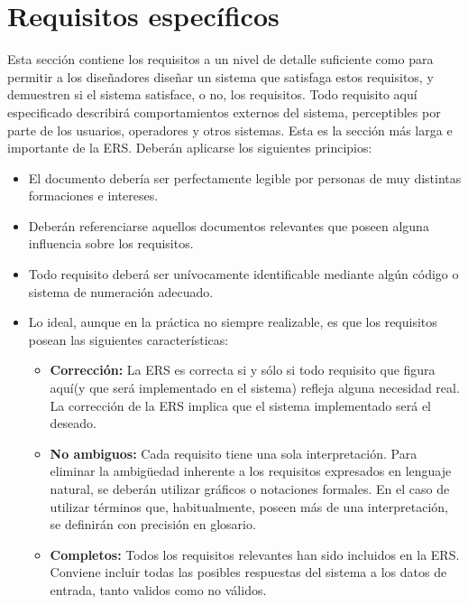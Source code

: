 \documentclass[12pt,a4paper, twosite]{article}
\begin{document}
	
	
	\section{Requisitos específicos}
	\label{sec:org40573d1}
	
	Esta sección contiene los requisitos a un nivel de detalle suficiente
	como para permitir a los diseñadores diseñar un sistema que
	satisfaga estos requisitos, y demuestren si el sistema satisface, o
	no, los requisitos. Todo requisito aquí especificado describirá
	comportamientos externos del sistema, perceptibles por parte de los
	usuarios, operadores y otros sistemas. Esta es la sección más larga
	e importante de la ERS. Deberán aplicarse los siguientes principios:
	
	\begin{itemize}
		\item El documento debería ser perfectamente legible por personas de muy
		distintas formaciones e intereses.
		
		\item Deberán referenciarse aquellos documentos relevantes que poseen
		alguna influencia sobre los requisitos.
		
		\item Todo requisito deberá ser unívocamente identificable mediante algún
		código o sistema de numeración adecuado.
		
		\item Lo ideal, aunque en la práctica no siempre realizable, es que los
		requisitos posean las siguientes características: 
		
		\begin{itemize}
			\item \textbf{Corrección:} La ERS es correcta si y sólo si todo requisito que
			figura aquí(y que será implementado en el sistema) refleja alguna
			necesidad real. La corrección de la ERS implica que el sistema
			implementado será el deseado.
			
			\item \textbf{No ambiguos:} Cada requisito tiene una sola interpretación. Para
			eliminar la ambigüedad inherente a los requisitos expresados en
			lenguaje natural, se deberán utilizar gráficos o notaciones
			formales. En el caso de utilizar términos que, habitualmente,
			poseen más de una interpretación, se definirán con precisión en
			glosario.
			
			\item \textbf{Completos:} Todos los requisitos relevantes han sido incluidos en
			la ERS. Conviene incluir todas las posibles respuestas del sistema
			a los datos de entrada, tanto validos como no válidos.
			

\end{itemize}
\end{itemize}
\end{document}
